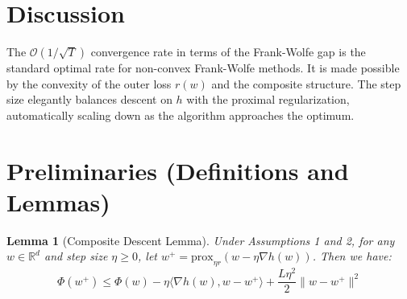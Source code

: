 \documentclass{article}
\newtheorem{lemma}{Lemma}
\begin{document}
\section*{Discussion}
The $\mathcal{O}(1/\sqrt{T})$ convergence rate in terms of the Frank-Wolfe gap is the standard optimal rate for non-convex Frank-Wolfe methods. It is made possible by the convexity of the outer loss $r(w)$ and the composite structure. The step size elegantly balances descent on $h$ with the proximal regularization, automatically scaling down as the algorithm approaches the optimum.

\section*{Preliminaries (Definitions and Lemmas)}
\begin{lemma}[Composite Descent Lemma]
Under Assumptions 1 and 2, for any $w \in \mathbb{R}^d$ and step size $\eta \geq 0$, let $w^+ = \text{prox}_{\eta r}(w - \eta \nabla h(w))$. Then we have:
\begin{equation}
    \Phi(w^+) \leq \Phi(w) - \eta \langle \nabla h(w), w - w^+ \rangle + \frac{L \eta^2}{2} \|w - w^+\|^2
\end{equation}
\end{lemma}
\end{document}
